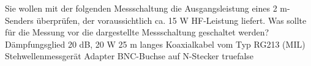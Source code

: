     {Sie wollen mit der folgenden Messschaltung die Ausgangsleistung eines 2 m-Senders überprüfen, der voraussichtlich ca. 15 W HF-Leistung liefert. Was sollte für die Messung vor die dargestellte Messschaltung geschaltet werden?}
    {Dämpfungsglied 20 dB, 20 W}
    {25 m langes Koaxialkabel vom Typ RG213 (MIL)}
    {Stehwellenmessgerät}
    {Adapter BNC-Buchse auf N-Stecker}
    {true}{false}